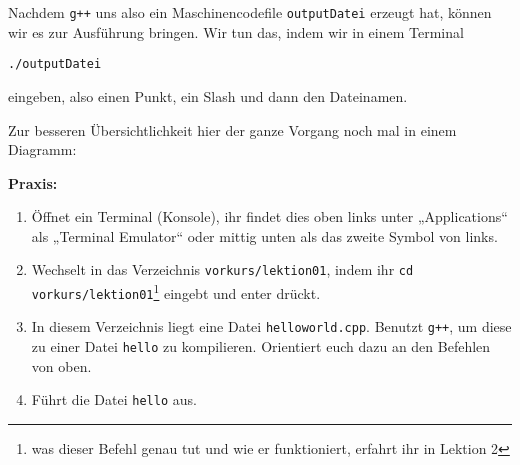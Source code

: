 Nachdem \texttt{g++} uns also ein Maschinencodefile \texttt{outputDatei}
erzeugt hat, können wir es zur Ausführung bringen. Wir tun das, indem wir in
einem Terminal
\begin{center}
	\texttt{./outputDatei}
\end{center}
eingeben, also einen Punkt, ein Slash und dann den Dateinamen.

Zur besseren Übersichtlichkeit hier der ganze Vorgang noch mal in einem
Diagramm:

\begin{center}
\end{center}

\textbf{Praxis:}
\begin{enumerate}
	\item Öffnet ein Terminal (Konsole), ihr findet dies oben links unter „Applications“ als „Terminal Emulator“ oder mittig unten als das zweite Symbol von links.
    \item Wechselt in das Verzeichnis \texttt{vorkurs/lektion01}, indem ihr
		\texttt{cd vorkurs/lektion01}\footnote{was dieser Befehl genau tut und wie er funktioniert, erfahrt ihr in Lektion 2} eingebt und enter drückt.
    \item In diesem Verzeichnis liegt eine Datei \texttt{helloworld.cpp}.
        Benutzt \texttt{g++}, um diese zu einer Datei \texttt{hello} zu
        kompilieren. Orientiert euch dazu an den Befehlen von oben.
    \item Führt die Datei \texttt{hello} aus.
\end{enumerate}


